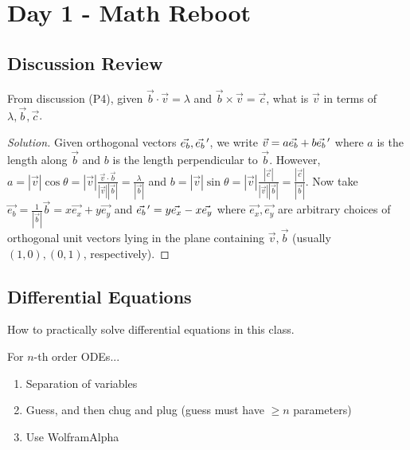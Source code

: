 \section{Day 1 - Math Reboot}

\subsection{Discussion Review}

\begin{prb}
From discussion (P4), given $\vec{b} \cdot \vec{v} = \lambda$ and $\vec{b}
\times \vec{v} = \vec{c}$, what is $\vec{v}$ in terms of $\lambda,
\vec{b}, \vec{c}$.
\end{prb}

\begin{proof}[Solution]
Given orthogonal vectors $\vec{e_b}, \pvec{e_b}'$, we write $\vec{v} = a
\vec{e_b} + b \pvec{e_b}'$ where $a$ is the length along $\vec{b}$ and
$b$ is the length perpendicular to $\vec{b}$. However, $a = |\vec{v}|
\cos \theta = |\vec{v}| \frac{\vec{v} \cdot \vec{b}}{|\vec{v}|
|\vec{b}|} = \frac{\lambda}{|\vec{b}|}$ and $b = |\vec{v}| \sin \theta =
|\vec{v}| \frac{|\vec{c}|}{|\vec{v}| |\vec{b}|} =
\frac{|\vec{c}|}{|\vec{b}|}$. Now take $\vec{e_b} = \frac{1}{|\vec{b}|}
\vec{b} = x \vec{e_x} + y \vec{e_y}$ and $\pvec{e_b}' = y \vec{e_x} - x
\vec{e_y}$ where $\vec{e_x}, \vec{e_y}$ are arbitrary choices of
orthogonal unit vectors lying in the plane containing $\vec{v}, \vec{b}$
(usually $(1, 0), (0, 1)$, respectively).
\end{proof}

\subsection{Differential Equations}

How to practically solve differential equations in this class.

For $n$-th order ODEs...
\begin{enumerate}
\item Separation of variables
\item Guess, and then chug and plug (guess must have $\geq n$
parameters)
\item Use Wolfram{\textbar}Alpha
\end{enumerate}

